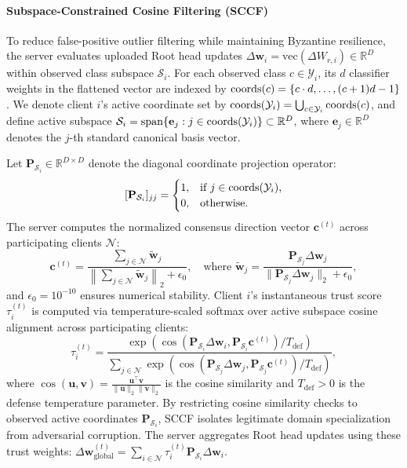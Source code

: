\paragraph{Subspace-Constrained Cosine Filtering (SCCF)}
To reduce false-positive outlier filtering while maintaining Byzantine resilience, the server evaluates uploaded Root head updates $\Delta \mathbf{w}_i = \mathrm{vec}(\Delta W_{r,i}) \in \mathbb{R}^D$ within observed class subspace $\mathcal{S}_i$. For each observed class $c \in \mathcal{Y}_i$, its $d$ classifier weights in the flattened vector are indexed by $\operatorname{coords}(c) = \{c \cdot d, \dots, (c+1)d - 1\}$. We denote client $i$'s active coordinate set by $\operatorname{coords}(\mathcal{Y}_i) = \bigcup_{c \in \mathcal{Y}_i} \operatorname{coords}(c)$, and define active subspace $\mathcal{S}_i = \operatorname{span}\{\mathbf{e}_j : j \in \operatorname{coords}(\mathcal{Y}_i)\} \subset \mathbb{R}^D$, where $\mathbf{e}_j \in \mathbb{R}^D$ denotes the $j$-th standard canonical basis vector.

Let $\mathbf{P}_{\mathcal{S}_i} \in \mathbb{R}^{D \times D}$ denote the diagonal coordinate projection operator:
\begin{equation}
\label{eq:coord_proj}
[\mathbf{P}_{\mathcal{S}_i}]_{jj} = 
\begin{cases} 
1, & \text{if } j \in \operatorname{coords}(\mathcal{Y}_i), \\ 
0, & \text{otherwise}.
\end{cases}
\end{equation}
The server computes the normalized consensus direction vector $\mathbf{c}^{(t)}$ across participating clients $\mathcal{N}$:
\begin{equation}
\label{eq:consensus_c}
\mathbf{c}^{(t)} = \frac{\sum_{j \in \mathcal{N}} \tilde{\mathbf{w}}_j}{\left\|\sum_{j \in \mathcal{N}} \tilde{\mathbf{w}}_j\right\|_2 + \epsilon_0}, \quad \text{where } \tilde{\mathbf{w}}_j = \frac{\mathbf{P}_{\mathcal{S}_j} \Delta \mathbf{w}_j}{\|\mathbf{P}_{\mathcal{S}_j} \Delta \mathbf{w}_j\|_2 + \epsilon_0},
\end{equation}
and $\epsilon_0 = 10^{-10}$ ensures numerical stability. Client $i$'s instantaneous trust score $\tau_i^{(t)}$ is computed via temperature-scaled softmax over active subspace cosine alignment across participating clients:
\begin{equation}
\label{eq:sccf}
\tau_i^{(t)} = \frac{\exp\left( \cos\left(\mathbf{P}_{\mathcal{S}_i} \Delta \mathbf{w}_i, \mathbf{P}_{\mathcal{S}_i} \mathbf{c}^{(t)}\right) / T_{\mathrm{def}} \right)}{\sum_{j \in \mathcal{N}} \exp\left( \cos\left(\mathbf{P}_{\mathcal{S}_j} \Delta \mathbf{w}_j, \mathbf{P}_{\mathcal{S}_j} \mathbf{c}^{(t)}\right) / T_{\mathrm{def}} \right)},
\end{equation}
where $\cos(\mathbf{u}, \mathbf{v}) = \frac{\mathbf{u}^\top \mathbf{v}}{\|\mathbf{u}\|_2 \|\mathbf{v}\|_2}$ is the cosine similarity and $T_{\mathrm{def}} > 0$ is the defense temperature parameter. By restricting cosine similarity checks to observed active coordinates $\mathbf{P}_{\mathcal{S}_i}$, SCCF isolates legitimate domain specialization from adversarial corruption. The server aggregates Root head updates using these trust weights: $\Delta \mathbf{w}_{\mathrm{global}}^{(t)} = \sum_{i \in \mathcal{N}} \tau_i^{(t)} \mathbf{P}_{\mathcal{S}_i} \Delta \mathbf{w}_i$.

